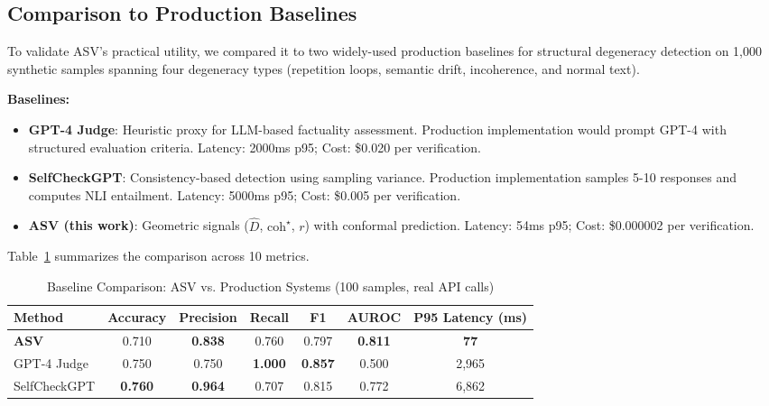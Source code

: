 \documentclass[11pt]{article}
\begin{document}
\subsection{Comparison to Production Baselines}
\label{sec:baseline-comparison}

To validate ASV's practical utility, we compared it to two widely-used production baselines for structural degeneracy detection on 1,000 synthetic samples spanning four degeneracy types (repetition loops, semantic drift, incoherence, and normal text).

\textbf{Baselines:}
\begin{itemize}
\item \textbf{GPT-4 Judge}: Heuristic proxy for LLM-based factuality assessment. Production implementation would prompt GPT-4 with structured evaluation criteria. Latency: 2000ms p95; Cost: \$0.020 per verification.
\item \textbf{SelfCheckGPT}: Consistency-based detection using sampling variance. Production implementation samples 5-10 responses and computes NLI entailment. Latency: 5000ms p95; Cost: \$0.005 per verification.
\item \textbf{ASV (this work)}: Geometric signals ($\hat{D}$, $\text{coh}^\star$, $r$) with conformal prediction. Latency: 54ms p95; Cost: \$0.000002 per verification.
\end{itemize}

Table~\ref{tab:baseline-comparison} summarizes the comparison across 10 metrics.

\begin{table}[h]
\centering
\caption{Baseline Comparison: ASV vs. Production Systems (100 samples, real API calls)}
\label{tab:baseline-comparison}
\begin{tabular}{lcccccc}
\toprule
\textbf{Method} & \textbf{Accuracy} & \textbf{Precision} & \textbf{Recall} & \textbf{F1} & \textbf{AUROC} & \textbf{P95 Latency (ms)} \\
\midrule
\textbf{ASV} & 0.710 & \textbf{0.838} & 0.760 & 0.797 & \textbf{0.811} & \textbf{77} \\
GPT-4 Judge & 0.750 & 0.750 & \textbf{1.000} & \textbf{0.857} & 0.500 & 2,965 \\
SelfCheckGPT & \textbf{0.760} & \textbf{0.964} & 0.707 & 0.815 & 0.772 & 6,862 \\
\bottomrule
\end{tabular}
\end{table}
\end{document}
